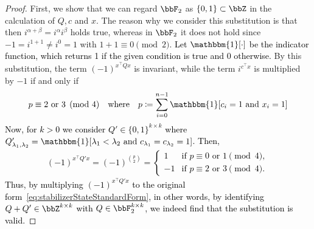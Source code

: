 \documentclass[aps,prx,onecolumn,superscriptaddress,nobibnotes,nofootinbib]{revtex4-2}
\newcommand{\black}[1]{\textcolor{black}{#1}}
\newcommand{\defeq}{\coloneqq}
\begin{document}
\begin{proof}
  First, we show that we can regard $\bbF_2$ as $\{0,1\} \subset \bbZ$ in the calculation of $Q,c$ and $x$.
  The reason why we consider this substitution is that then $i^{\alpha+\beta}=i^\alpha i^\beta$ holds true, whereas in $\bbF_2$ it does not hold since $-1=i^{1+1} \neq i^{0}=1$ with $1+1 \equiv 0 \pmod 2$.
  \black{Let $\mathbbm{1}[\cdot]$ be the indicator function, which returns 1 if the given condition is true and 0 otherwise.}
  By this substitution, the term $(-1)^{x^\top Q x}$ is invariant, while the term $i^{c^\top x}$ is multiplied by $-1$ if and only if
  \begin{equation*}
    p \equiv 2 \text{ or } 3 \pmod 4 \quad \text{where} \quad  p \defeq \sum_{i=0}^{n-1} \mathbbm{1}[c_i=1 \text{ and } x_i=1]
  \end{equation*}
  \black{Now, for $k>0$ we consider $Q' \in \{0,1\}^{k \times k}$ where $Q'_{{\lambda_1},{\lambda_2}} = \mathbbm{1}[\lambda_1< \lambda_2 \text{ and } c_{\lambda_1}=c_{\lambda_2}=1]$. Then,
  \begin{align*}
    (-1)^{x^\top Q' x}=(-1)^{\binom{p}{2}}=
    \begin{cases}
      1  & \text{if $p \equiv 0 \text{ or } 1 \pmod 4$}, \\
      -1 & \text{if $p \equiv 2 \text{ or } 3 \pmod 4$}.
    \end{cases}
  \end{align*}
  Thus, by multiplying $(-1)^{x^\top Q' x}$ to the original form~\eqref{eq:stabilizerStateStandardForm}, in other words, by identifying $Q+Q' \in \bbZ^{k \times k}$ with $Q \in \bbF_2^{k\times k}$, we indeed find that the substitution is valid.}


\end{proof}
\end{document}
